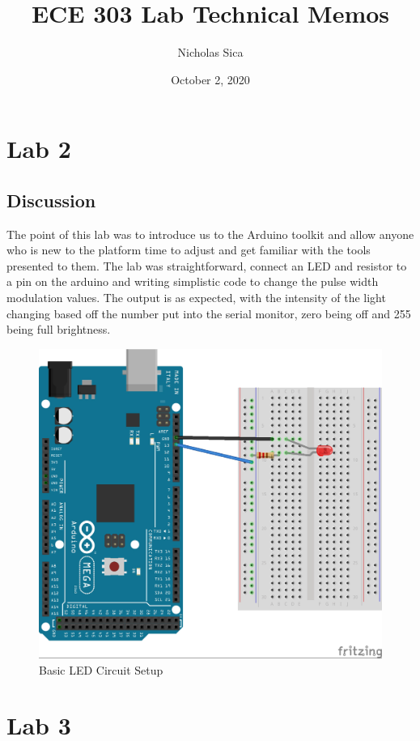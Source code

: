 \documentclass[12pt,titlepage]{article}
\begin{document}
\title{ECE 303 Lab Technical Memos}
\author{Nicholas Sica}
\date{October 2, 2020}
\maketitle

\tableofcontents
\newpage

\section{Lab 2}
\subsection{Discussion}
The point of this lab was to introduce us to the Arduino toolkit and allow anyone who is new to the platform
time to adjust and get familiar with the tools presented to them. The lab was straightforward, connect an LED
and resistor to a pin on the arduino and writing simplistic code to change the pulse width modulation values.
The output is as expected, with the intensity of the light changing based off the number put into the serial
monitor, zero being off and 255 being full brightness.
\begin{figure}[!htb]
  \centering
  \includegraphics[width=5.0in]{lab_2/schematic.png}
  \caption{Basic LED Circuit Setup}\label{fig:lab_2}
\end{figure}
\newpage
\section{Lab 3}
\end{document}
